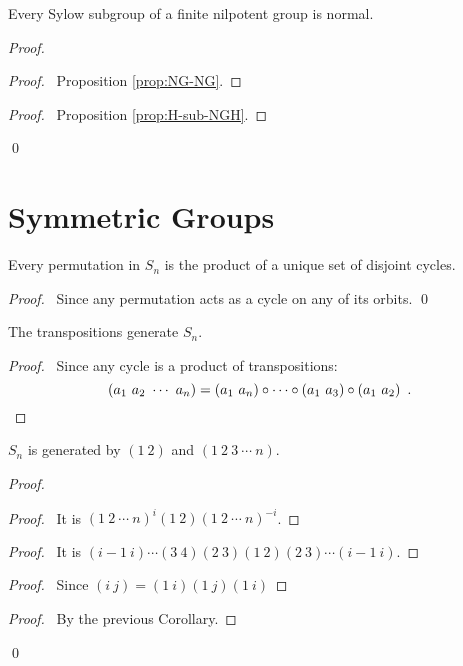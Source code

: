 \begin{cor}
Every Sylow subgroup of a finite nilpotent group is normal.
\end{cor}

\begin{proof}
\pf
{}
\begin{proof}
	\pf\ Proposition \ref{prop:NG-NG}.
\end{proof}
\begin{proof}
	\pf\ Proposition \ref{prop:H-sub-NGH}.
\end{proof}
\qed
\end{proof}


\section{Symmetric Groups}

\begin{prop}
Every permutation in $S_n$ is the product of a unique set of disjoint cycles.
\end{prop}

\begin{proof}
\pf\ Since any permutation acts as a cycle on any of its orbits. \qed
\end{proof}

\begin{cor}
The transpositions generate $S_n$.
\end{cor}

\begin{proof}
\pf\ Since any cycle is a product of transpositions:
\[ (a_1\ a_2\ \cdots\ a_n) = (a_1\ a_n) \circ \cdots \circ (a_1\ a_3) \circ (a_1\ a_2) \enspace . \qed \]
\end{proof}

\begin{cor}
$S_n$ is generated by $(1\ 2)$ and $(1\ 2\ 3\ \cdots\ n)$.
\end{cor}

\begin{proof}
\pf
{}
\begin{proof}
	\pf\ It is $(1\ 2\ \cdots\ n)^i (1\ 2) (1\ 2\ \cdots\ n)^{-i}$.
\end{proof}
\begin{proof}
	\pf\ It is $(i-1\ i)\cdots (3\ 4)(2\ 3)(1\ 2)(2\ 3) \cdots (i-1\ i)$.
\end{proof}
\begin{proof}
	\pf\ Since $(i\ j) = (1\ i)(1\ j)(1\ i)$
\end{proof}
\begin{proof}
	\pf\ By the previous Corollary.
\end{proof}
\qed	
\end{proof}

